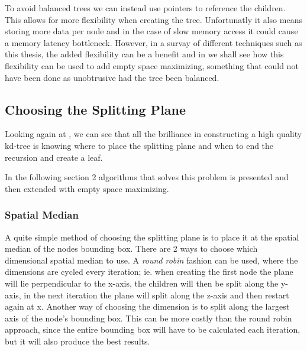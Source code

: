 To avoid balanced trees we can instead use pointers to reference the
children. This allows for more flexibility when creating the tree.
Unfortunatly it also means storing more data per node and in the case
of slow memory access it could cause a memory latency
bottleneck. However, in a survay of different techniques such as this
thesis, the added flexibility can be a benefit and in
 we shall see how this flexibility can
be used to add empty space maximizing, something that could not have
been done as unobtrusive had the tree been balanced.




\subsection{Choosing the Splitting Plane}\label{sec:splittingPlane}


Looking again at , we can see that all the
brilliance in constructing a high quality kd-tree is knowing where to
place the splitting plane and when to end the recursion and create a
leaf.


In the following section 2 algorithms that solves this problem is
presented and then extended with empty space maximizing.


\subsubsection{Spatial Median}



A quite simple method of choosing the splitting plane is to place it
at the spatial median of the nodes bounding box. There are 2 ways to
choose which dimensional spatial median to use. A \textit{round robin}
fashion can be used, where the dimensions are cycled every iteration;
ie. when creating the first node the plane will lie perpendicular to
the x-axis, the children will then be split along the y-axis, in the
next iteration the plane will split along the z-axis and then restart
again at x. Another way of choosing the dimension is to split along
the largest axis of the node's bounding box. This can be more costly
than the round robin approach, since the entire bounding box will have
to be calculated each iteration, but it will also produce the best
results.

